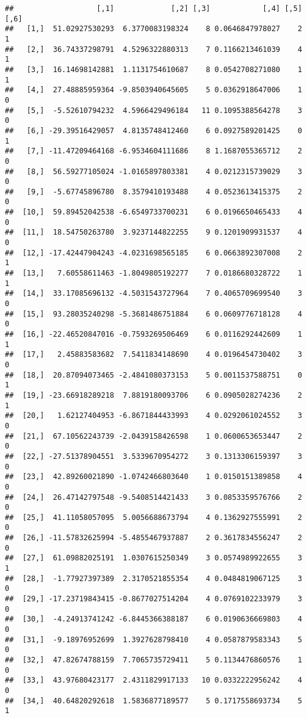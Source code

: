 \documentclass[]{article}
\begin{document}
\begin{verbatim}
##                   [,1]             [,2] [,3]            [,4] [,5] [,6]
##   [1,]  51.02927530293  6.3770083198324    8 0.0646847978027    2    1
##   [2,]  36.74337298791  4.5296322880313    7 0.1166213461039    4    1
##   [3,]  16.14698142881  1.1131754610687    8 0.0542708271080    1    1
##   [4,]  27.48885959364 -9.8503940645605    5 0.0362918647006    1    0
##   [5,]  -5.52610794232  4.5966429496184   11 0.1095388564278    3    0
##   [6,] -29.39516429057  4.8135748412460    6 0.0927589201425    0    1
##   [7,] -11.47209464168 -6.9534604111686    8 1.1687055365712    2    0
##   [8,]  56.59277105024 -1.0165897803381    4 0.0212315739029    3    0
##   [9,]  -5.67745896780  8.3579410193488    4 0.0523613415375    2    0
##  [10,]  59.89452042538 -6.6549733700231    6 0.0196650465433    4    0
##  [11,]  18.54750263780  3.9237144822255    9 0.1201909931537    4    0
##  [12,] -17.42447904243 -4.0231698565185    6 0.0663892307008    2    1
##  [13,]   7.60558611463 -1.8049805192277    7 0.0186680328722    1    1
##  [14,]  33.17085696132 -4.5031543727964    7 0.4065709699540    3    0
##  [15,]  93.28035240298 -5.3681486751884    6 0.0609776718128    4    0
##  [16,] -22.46520847016 -0.7593269506469    6 0.0116292442609    1    1
##  [17,]   2.45883583682  7.5411834148690    4 0.0196454730402    3    0
##  [18,]  20.87094073465 -2.4841080373153    5 0.0011537588751    0    1
##  [19,] -23.66918289218  7.8819180093706    6 0.0905028274236    2    1
##  [20,]   1.62127404953 -6.8671844433993    4 0.0292061024552    3    0
##  [21,]  67.10562243739 -2.0439158426598    1 0.0600653653447    2    0
##  [22,] -27.51378904551  3.5339670954272    3 0.1313306159397    3    0
##  [23,]  42.89260021890 -1.0742466803640    1 0.0150151389858    4    0
##  [24,]  26.47142797548 -9.5408514421433    3 0.0853359576766    2    0
##  [25,]  41.11058057095  5.0056688673794    4 0.1362927555991    2    0
##  [26,] -11.57832625994 -5.4855467937887    2 0.3617834556247    2    0
##  [27,]  61.09882025191  1.0307615250349    3 0.0574989922655    3    1
##  [28,]  -1.77927397389  2.3170521855354    4 0.0484819067125    3    0
##  [29,] -17.23719843415 -0.8677027514204    4 0.0769102233979    3    0
##  [30,]  -4.24913741242 -6.8445366388187    6 0.0190636669803    4    0
##  [31,]  -9.18976952699  1.3927628798410    4 0.0587879583343    5    0
##  [32,]  47.82674788159  7.7065735729411    5 0.1134476860576    1    0
##  [33,]  43.97680423177  2.4311829917133   10 0.0332222956242    4    0
##  [34,]  40.64820292618  1.5836877189577    5 0.1717558693734    5    1

\end{verbatim}
\end{document}
